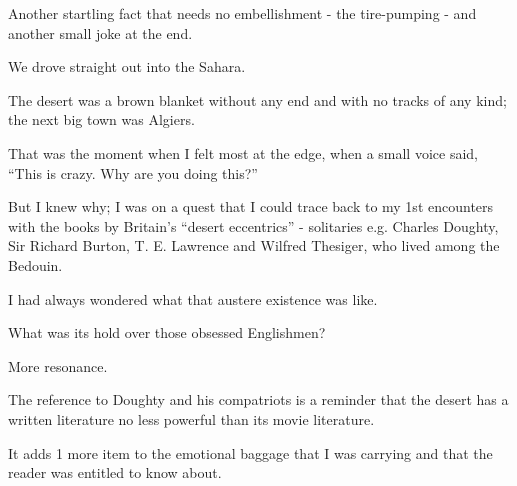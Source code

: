 \documentclass{book}
\numberwithin{equation}{section}
\begin{document}
%
Another startling fact that needs no embellishment - the tire-pumping - and another small joke at the end.

%
We drove straight out into the Sahara.

The desert was a brown blanket without any end and with no tracks of any kind; the next big town was Algiers.

That was the moment when I felt most at the edge, when a small voice said, ``This is crazy. Why are you doing this?''

But I knew why; I was on a quest that I could trace back to my 1st encounters with the books by Britain's ``desert eccentrics'' - solitaries e.g. Charles Doughty, Sir Richard Burton, T. E. Lawrence and Wilfred Thesiger, who lived among the Bedouin.

I had always wondered what that austere existence was like.

What was its hold over those obsessed Englishmen?

More resonance.

The reference to Doughty and his compatriots is a reminder that the desert has a written literature no less powerful than its movie literature.

It adds 1 more item to the emotional baggage that I was carrying and that the reader was entitled to know about.
\end{document}
